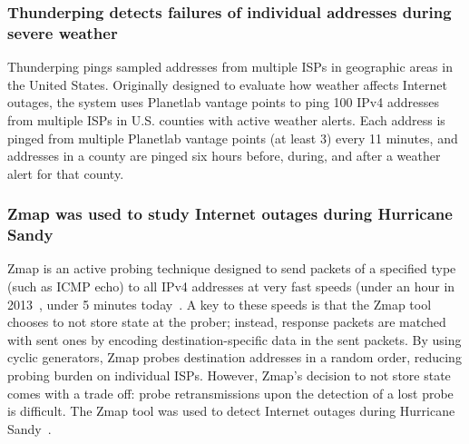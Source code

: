 \subsubsection{Thunderping detects failures of individual addresses
  during severe weather}

Thunderping pings
sampled addresses from multiple ISPs in geographic areas in the United
States. Originally designed to evaluate how weather affects Internet
outages, the system uses Planetlab vantage points to ping 100 IPv4
addresses from multiple ISPs in U.S. counties with active
weather alerts. Each address is pinged from multiple Planetlab vantage
points (at least 3) every 11 minutes, and addresses in a county are
pinged six hours before, during, and after a weather alert for that
county. 


\subsubsection{Zmap was used to study Internet outages during
  Hurricane Sandy}

Zmap is an active probing technique designed to send packets of a
specified type (such as ICMP echo) to all IPv4 addresses at
very fast speeds (under an hour in 2013~\cite{durumeric2013zmap},
under 5 minutes today~\cite{zippier-zmap}. A key to these speeds is that the
Zmap tool chooses to not store state at the prober; instead, response
packets are matched with sent ones by encoding destination-specific data
in the sent packets. By using cyclic generators, Zmap probes
destination addresses in a random order, reducing probing burden on
individual ISPs. However, Zmap's decision to not store state comes
with a trade off: probe retransmissions upon the detection of a lost
probe is difficult. The Zmap
tool was used to detect Internet outages during Hurricane
Sandy~\cite{durumeric2013zmap}. %



